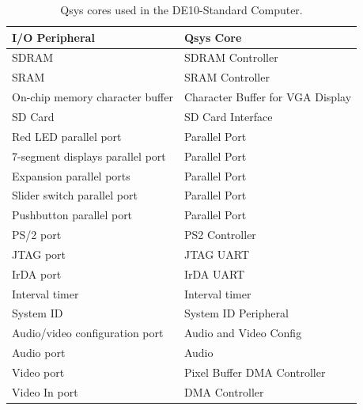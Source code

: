 \documentclass[11pt, twoside, pdftex]{article}
\newcommand{\commonFiles}{../../../common/doc}
\newcommand{\systemName}{DE10-Standard Computer}
\begin{document}
\begin{table}[h]
    \begin{center}
    \begin{tabular}{l|l}
            \textbf{I/O Peripheral}
            & \textbf{Qsys Core}
        \\\hline
            SDRAM
            & SDRAM Controller
        \\
            SRAM
        &   SRAM Controller
        \\
            On-chip memory character buffer
				& Character Buffer for VGA Display
        \\
            SD Card
        &   SD Card Interface
        \\
            Red LED parallel port
				& Parallel Port
        \\
            7-segment displays parallel port
				& Parallel Port
        \\
            Expansion parallel ports
				& Parallel Port
        \\
            Slider switch parallel port
				& Parallel Port
        \\
            Pushbutton parallel port
				& Parallel Port
        \\
            PS/2 port
				& PS2 Controller
        \\
            JTAG port
				& JTAG UART
        \\
            IrDA port
				& IrDA UART
        \\
            Interval timer
				& Interval timer 
        \\
            System ID
				& System ID Peripheral
        \\
            Audio/video configuration port
				& Audio and Video Config
        \\
            Audio port
				& Audio
        \\
            Video port
				& Pixel Buffer DMA Controller
        \\
            Video In port
				& DMA Controller
        \\
    \end{tabular}
    \caption{Qsys cores used in the \systemName.}
    \label{tab:sopcnames}
    \end{center}
\end{table}


\end{document}
